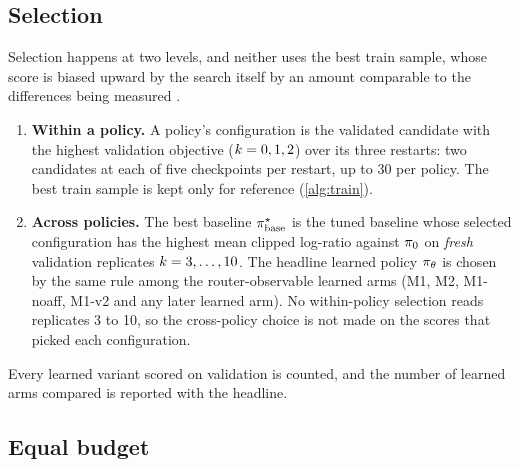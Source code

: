 \subsection{Selection}
\label{sec:selection}

Selection happens at two levels, and neither uses the best train sample, whose score is biased
upward by the search itself by an amount comparable to the differences being measured
\citep{cawley2010overfitting}.
\begin{enumerate}
  \item \textbf{Within a policy.} A policy's configuration is the validated candidate with the
    highest validation objective ($k = 0,1,2$) over its three restarts: two candidates at each
    of five checkpoints per restart, up to 30 per policy. The best train sample is kept only for
    reference (\cref{alg:train}).
  \item \textbf{Across policies.} The best baseline $\pi^{\star}_{\mathrm{base}}$ is the tuned baseline whose selected
    configuration has the highest mean clipped log-ratio against $\pi_{0}$ on \emph{fresh} validation
    replicates $k = 3,\dots,10$. The headline learned policy $\pi_{\theta}$ is chosen by the same
    rule among the router-observable learned arms (M1, M2, M1-noaff, M1-v2 and any later learned
    arm). No within-policy selection reads replicates 3 to 10, so the cross-policy
    choice is not made on the scores that picked each configuration.
\end{enumerate}
Every learned variant scored on validation is counted, and the number of learned arms compared is
reported with the headline.

\subsection{Equal budget}
\label{sec:budget}

